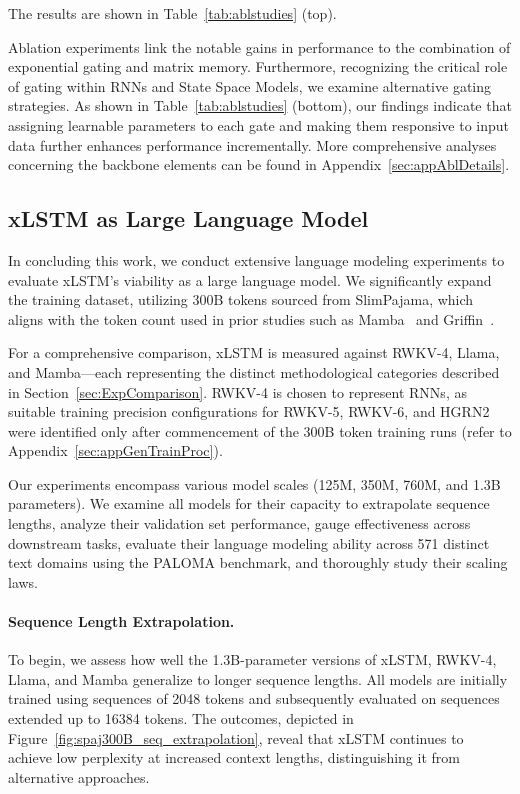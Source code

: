The results are shown in Table~\ref{tab:ablstudies} (top). 

Ablation experiments link the notable gains in performance to the combination of exponential gating and matrix memory. Furthermore, recognizing the critical role of gating within RNNs and State Space Models, we examine alternative gating strategies. As shown in Table~\ref{tab:ablstudies} (bottom), our findings indicate that assigning learnable parameters to each gate and making them responsive to input data further enhances performance incrementally. More comprehensive analyses concerning the backbone elements can be found in Appendix~\ref{sec:appAblDetails}.

\subsection{xLSTM as Large Language Model}
\label{sec:ExpLanguage}

In concluding this work, we conduct extensive language modeling experiments to evaluate xLSTM's viability as a large language model. We significantly expand the training dataset, utilizing 300B tokens sourced from SlimPajama, which aligns with the token count used in prior studies such as Mamba~\citep{Gu:24arxiv} and Griffin~\citep{De:24arxiv}.

For a comprehensive comparison, xLSTM is measured against RWKV-4, Llama, and Mamba—each representing the distinct methodological categories described in Section~\ref{sec:ExpComparison}. RWKV-4 is chosen to represent RNNs, as suitable training precision configurations for RWKV-5, RWKV-6, and HGRN2 were identified only after commencement of the 300B token training runs (refer to Appendix~\ref{sec:appGenTrainProc}).

Our experiments encompass various model scales (125M, 350M, 760M, and 1.3B parameters). We examine all models for their capacity to extrapolate sequence lengths, analyze their validation set performance, gauge effectiveness across downstream tasks, evaluate their language modeling ability across 571 distinct text domains using the PALOMA benchmark, and thoroughly study their scaling laws.

\paragraph{Sequence Length Extrapolation.}
\label{sec:spaj300B_ctx_extrapolation}
To begin, we assess how well the 1.3B-parameter versions of xLSTM, RWKV-4, Llama, and Mamba generalize to longer sequence lengths. All models are initially trained using sequences of 2048 tokens and subsequently evaluated on sequences extended up to 16384 tokens. The outcomes, depicted in Figure~\ref{fig:spaj300B_seq_extrapolation}, reveal that xLSTM continues to achieve low perplexity at increased context lengths, distinguishing it from alternative approaches.

